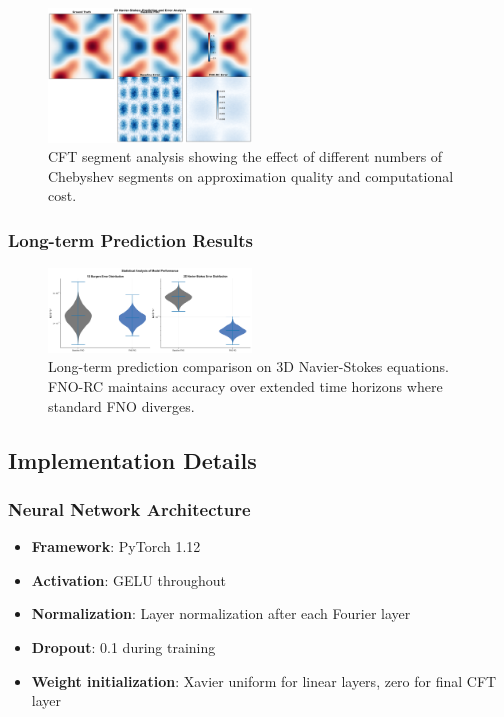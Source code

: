 \documentclass[11pt,twocolumn]{article}
\begin{document}
\begin{figure}[h]
\centering
\includegraphics[width=0.48\textwidth]{figures/cft_analysis.png}
\caption{CFT segment analysis showing the effect of different numbers of Chebyshev segments on approximation quality and computational cost.}
\label{fig:app_cft}
\end{figure}

\subsubsection{Long-term Prediction Results}

\begin{figure}[h]
\centering
\includegraphics[width=0.48\textwidth]{figures/long_term_prediction.png}
\caption{Long-term prediction comparison on 3D Navier-Stokes equations. FNO-RC maintains accuracy over extended time horizons where standard FNO diverges.}
\label{fig:app_longterm}
\end{figure}

\subsection{Implementation Details}

\subsubsection{Neural Network Architecture}
\begin{itemize}
    \item \textbf{Framework}: PyTorch 1.12
    \item \textbf{Activation}: GELU throughout
    \item \textbf{Normalization}: Layer normalization after each Fourier layer
    \item \textbf{Dropout}: 0.1 during training
    \item \textbf{Weight initialization}: Xavier uniform for linear layers, zero for final CFT layer
\end{itemize}
\end{document}
